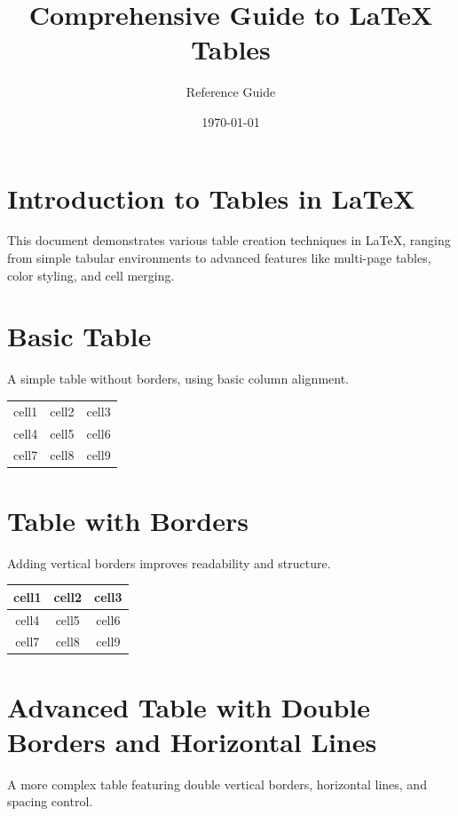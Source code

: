 \documentclass[12pt]{article}
\begin{document}
	
	\title{\textbf{Comprehensive Guide to LaTeX Tables}}
	\author{Reference Guide}
	\date{\today}
	\maketitle
	
	\tableofcontents
	\newpage
	
	\section{Introduction to Tables in LaTeX}
	This document demonstrates various table creation techniques in \LaTeX, ranging from simple tabular environments to advanced features like multi-page tables, color styling, and cell merging.
	
	\section{Basic Table}
	A simple table without borders, using basic column alignment.
	
	\begin{center}
		\begin{tabular}{c c c}
			cell1 & cell2 & cell3 \\ 
			cell4 & cell5 & cell6 \\  
			cell7 & cell8 & cell9    
		\end{tabular}
	\end{center}
	
	\section{Table with Borders}
	Adding vertical borders improves readability and structure.
	
	\begin{center}
		\begin{tabular}{|c|c|c|}
			\hline
			cell1 & cell2 & cell3 \\ 
			\hline
			cell4 & cell5 & cell6 \\  
			\hline
			cell7 & cell8 & cell9 \\
			\hline
		\end{tabular}
	\end{center}
	
	\section{Advanced Table with Double Borders and Horizontal Lines}
	A more complex table featuring double vertical borders, horizontal lines, and spacing control.
	
\end{document}
